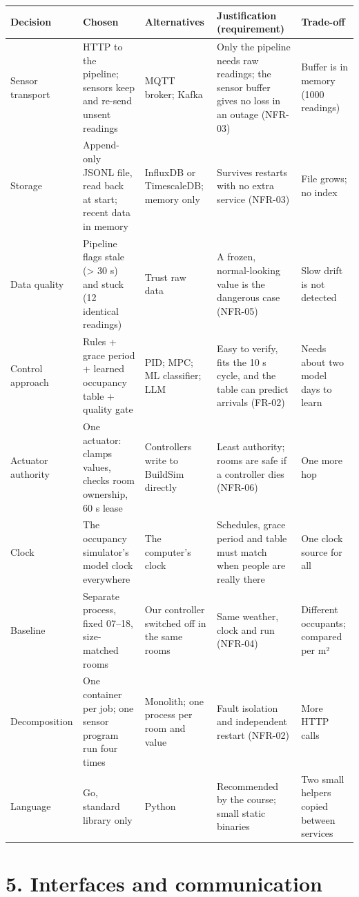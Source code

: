 \documentclass[11pt]{article}
\begin{document}
\begin{longtable}{@{}L{0.16}L{0.21}L{0.17}L{0.26}L{0.2}@{}}
\toprule
\textbf{Decision} & \textbf{Chosen} & \textbf{Alternatives} & \textbf{Justification (requirement)} & \textbf{Trade-off} \\
\midrule
\endhead
\bottomrule
\endlastfoot
Sensor transport & HTTP to the pipeline; sensors keep and re-send unsent readings & MQTT broker; Kafka & Only the pipeline needs raw readings; the sensor buffer gives no loss in an outage (NFR-03) & Buffer is in memory (1000 readings) \\
Storage & Append-only JSONL file, read back at start; recent data in memory & InfluxDB or TimescaleDB; memory only & Survives restarts with no extra service (NFR-03) & File grows; no index \\
Data quality & Pipeline flags stale (> 30 s) and stuck (12 identical readings) & Trust raw data & A frozen, normal-looking value is the dangerous case (NFR-05) & Slow drift is not detected \\
Control approach & Rules + grace period + learned occupancy table + quality gate & PID; MPC; ML classifier; LLM & Easy to verify, fits the 10 s cycle, and the table can predict arrivals (FR-02) & Needs about two model days to learn \\
Actuator authority & One actuator: clamps values, checks room ownership, 60 s lease & Controllers write to BuildSim directly & Least authority; rooms are safe if a controller dies (NFR-06) & One more hop \\
Clock & The occupancy simulator's model clock everywhere & The computer's clock & Schedules, grace period and table must match when people are really there & One clock source for all \\
Baseline & Separate process, fixed 07--18, size-matched rooms & Our controller switched off in the same rooms & Same weather, clock and run (NFR-04) & Different occupants; compared per m² \\
Decomposition & One container per job; one sensor program run four times & Monolith; one process per room and value & Fault isolation and independent restart (NFR-02) & More HTTP calls \\
Language & Go, standard library only & Python & Recommended by the course; small static binaries & Two small helpers copied between services \\
\end{longtable}

\section{5. Interfaces and communication}\label{interfaces}
\end{document}
